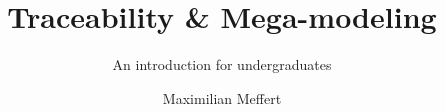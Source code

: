 \title{Traceability \& Mega-modeling}
\subtitle{An introduction for undergraduates}
\author{Maximilian Meffert}
\maketitle